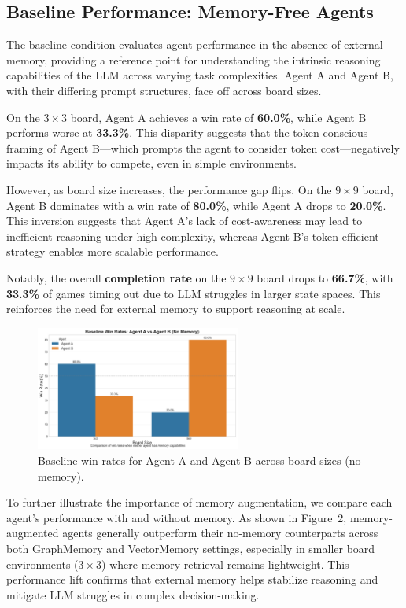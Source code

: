\documentclass[10pt]{article}
\begin{document}
\subsection{Baseline Performance: Memory-Free Agents}

The baseline condition evaluates agent performance in the absence of external memory, providing a reference point for understanding the intrinsic reasoning capabilities of the LLM across varying task complexities. Agent A and Agent B, with their differing prompt structures, face off across board sizes.

On the $3\times3$ board, Agent A achieves a win rate of \textbf{60.0\%}, while Agent B performs worse at \textbf{33.3\%}. This disparity suggests that the token-conscious framing of Agent B---which prompts the agent to consider token cost---negatively impacts its ability to compete, even in simple environments.

However, as board size increases, the performance gap flips. On the $9\times9$ board, Agent B dominates with a win rate of \textbf{80.0\%}, while Agent A drops to \textbf{20.0\%}. This inversion suggests that Agent A's lack of cost-awareness may lead to inefficient reasoning under high complexity, whereas Agent B's token-efficient strategy enables more scalable performance.

Notably, the overall \textbf{completion rate} on the $9\times9$ board drops to \textbf{66.7\%}, with \textbf{33.3\%} of games timing out due to LLM struggles in larger state spaces. This reinforces the need for external memory to support reasoning at scale.

\begin{figure}[H]
\centering
\includegraphics[width=0.6\textwidth]{figures/memory_baseline/baseline_win_rates.png}
\caption{Baseline win rates for Agent A and Agent B across board sizes (no memory).}
\label{fig:baseline_win_rates}
\end{figure}

To further illustrate the importance of memory augmentation, we compare each agent’s performance with and without memory. As shown in Figure~2, memory-augmented agents generally outperform their no-memory counterparts across both GraphMemory and VectorMemory settings, especially in smaller board environments ($3\times3$) where memory retrieval remains lightweight. This performance lift confirms that external memory helps stabilize reasoning and mitigate LLM struggles in complex decision-making.
\end{document}
